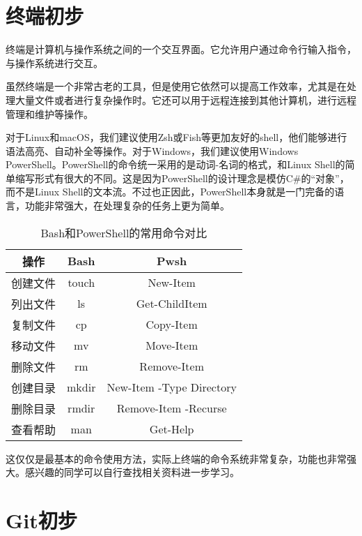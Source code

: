 \documentclass[../main.tex]{subfiles}
\begin{document}
\section{终端初步}\label{sec:terminal}

终端是计算机与操作系统之间的一个交互界面。它允许用户通过命令行输入指令，与操作系统进行交互。

虽然终端是一个非常古老的工具，但是使用它依然可以提高工作效率，尤其是在处理大量文件或者进行复杂操作时。它还可以用于远程连接到其他计算机，进行远程管理和维护等操作。

对于Linux和macOS，我们建议使用Zsh或Fish等更加友好的shell，他们能够进行语法高亮、自动补全等操作。对于Windows，我们建议使用Windows PowerShell。PowerShell的命令统一采用的是动词-名词的格式，和Linux Shell的简单缩写形式有很大的不同。这是因为PowerShell的设计理念是模仿C\#的“对象”，而不是Linux Shell的文本流。不过也正因此，PowerShell本身就是一门完备的语言，功能非常强大，在处理复杂的任务上更为简单。

\begin{table}[htbp]
    \centering
    \begin{tabular}{|c|cc|}
        \hline
        \textbf{操作} & \textbf{Bash} & \textbf{Pwsh} \\
        \hline
        创建文件 & touch & New-Item \\
        \hline
        列出文件 & ls & Get-ChildItem \\
        \hline
        复制文件 & cp & Copy-Item \\
        \hline
        移动文件 & mv & Move-Item \\
        \hline
        删除文件 & rm & Remove-Item \\
        \hline
        创建目录 & mkdir & New-Item -Type Directory \\
        \hline
        删除目录 & rmdir & Remove-Item -Recurse \\
        \hline
        查看帮助 & man & Get-Help \\
        \hline
    \end{tabular}
    \caption{Bash和PowerShell的常用命令对比}
    \label{tab:terminal-commands}
\end{table}

这仅仅是最基本的命令使用方法，实际上终端的命令系统非常复杂，功能也非常强大。感兴趣的同学可以自行查找相关资料进一步学习。


\section{Git初步}\label{sec:git}
\end{document}
